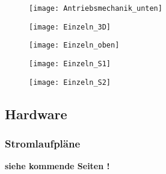 \documentclass[titlepage,12pt,twoside]{article}
\begin{document}
\begin{figure}[H]
	\begin{center}
		\scalebox{1.6}
		{\texttt{[image: Antriebsmechanik\_unten]}}
		\label{fig:Antriebsmechanik_unten}		
	\end{center}
\end{figure}
\begin{figure}[H]
	\begin{center}
		\scalebox{1.2}
		{\texttt{[image: Einzeln\_3D]}}
		\label{fig:Einzeln_3D}		
	\end{center}
\end{figure}
\begin{figure}[H]
	\begin{center}
		\scalebox{1.4}
		{\texttt{[image: Einzeln\_oben]}}
		\label{fig:Einzeln_oben}		
	\end{center}
\end{figure}
\begin{figure}[H]
	\begin{center}
		\scalebox{1.4}
		{\texttt{[image: Einzeln\_S1]}}
		\label{fig:Einzeln_S1}		
	\end{center}
\end{figure}
\begin{figure}[H]
	\begin{center}
		\scalebox{1.4}
		{\texttt{[image: Einzeln\_S2]}}
		\label{fig:Einzeln_S2}		
	\end{center}
\end{figure}

\newpage
\subsection{Hardware}
\label{chap:Fertigungsunterlagen_Hardware}
\subsubsection{Stromlaufpläne}

\textbf{siehe kommende Seiten !}




\end{document}
